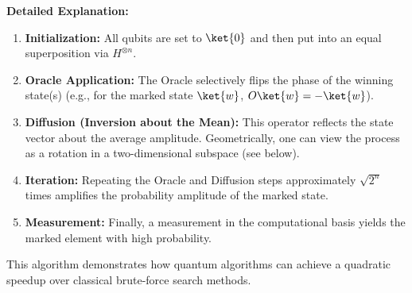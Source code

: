 \noindent
\textbf{Detailed Explanation:}
\begin{enumerate}
  \item \textbf{Initialization:} All qubits are set to \(\ket{0}\) and then
    put into an equal superposition via \(H^{\otimes n}\).

  \item \textbf{Oracle Application:} The Oracle selectively flips the phase
    of the winning state(s) (e.g., for the marked state \(\ket{w}\),
    \(O\ket{w} = -\ket{w}\)).

  \item \textbf{Diffusion (Inversion about the Mean):} This operator reflects
    the state vector about the average amplitude. Geometrically, one can
    view the process as a rotation in a two-dimensional subspace (see
    below).

  \item \textbf{Iteration:} Repeating the Oracle and Diffusion steps
    approximately \( \sqrt{2^n} \) times amplifies the probability amplitude of
    the marked state.

  \item \textbf{Measurement:} Finally, a measurement in the computational
    basis yields the marked element with high probability.
\end{enumerate}

This algorithm demonstrates how quantum algorithms can achieve a quadratic
speedup over classical brute-force search methods.

